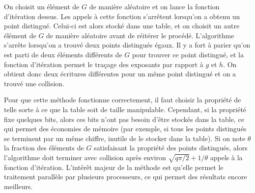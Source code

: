         On choisit un élément de $G$ de manière aléatoire et on lance la fonction d'itération dessus. Les appels à cette fonction s'arrêtent lorsqu'on a obtenu un point distingué. Celui-ci est alors stocké dans une table, et on choisit un autre élément de $G$ de manière aléatoire avant de réitérer le procédé. L'algorithme s'arrête lorsqu'on a trouvé deux points distingués égaux. Il y a fort à parier qu'on est parti de deux éléments différents de $G$ pour trouver ce point distingué, et la fonction d'itération permet le traçage des exposants par rapport à $g$ et $h$. On obtient donc deux écritures différentes pour un même point distingué et on a trouvé une collision.

        Pour que cette méthode fonctionne correctement, il faut choisir la propriété de telle sorte à ce que la table soit de taille manipulable. Cependant, si la propriété fixe quelques bits, alors ces bits n'ont pas besoin d'être stockés dans la table, ce qui permet des économies de mémoire (par exemple, si tous les points distingués se terminent par un même chiffre, inutile de le stocker dans la table). Si on note $\theta$ la fraction des éléments de $G$ satisfaisant la propriété des points distingués, alors l'algorithme doit terminer avec collision après environ $\sqrt{q\pi/2} + 1/\theta$ appels à la fonction d'itération. L'intérêt majeur de la méthode est qu'elle permet le traitement parallèle par plusieurs processeurs, ce qui permet des résultats encore meilleurs.
